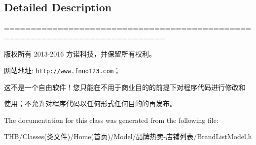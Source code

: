 \subsection{Detailed Description}
============================================================================

版权所有 2013-\/2016 方诺科技，并保留所有权利。

网站地址\+: \href{http://www.fnuo123.com}{\tt http\+://www.\+fnuo123.\+com}； 



这不是一个自由软件！您只能在不用于商业目的的前提下对程序代码进行修改和

使用；不允许对程序代码以任何形式任何目的的再发布。 

 

The documentation for this class was generated from the following file\+:\begin{DoxyCompactItemize}
\item 
T\+H\+B/\+Classes(类文件)/\+Home(首页)/\+Model/品牌热卖-\/店铺列表/Brand\+List\+Model.\+h\end{DoxyCompactItemize}
